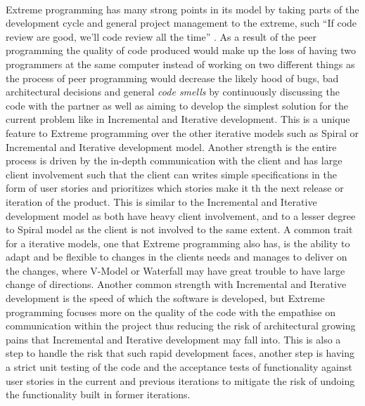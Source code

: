 \documentclass{style/CRPITStyle}
\renewcommand{\cite}{\citep}
\begin{document}
\paragraph{}
Extreme programming has many strong points in its model by taking parts of the
development cycle and general project management to the extreme, such ``If code
review are good, we'll code review all the time'' \cite{beck:2000:xp}. As a
result of the peer programming the quality of code produced would make up the
loss of having two programmers at the same computer instead of working on two
different things as the process of peer programming would decrease the
likely hood of bugs, bad architectural decisions and general \emph{code smells}
by continuously discussing the code with the partner as well as aiming to
develop the simplest solution for the current problem like in Incremental and
Iterative development. This is a unique feature
to Extreme programming over the other iterative models such as Spiral or
Incremental and Iterative development model.
Another strength is the entire process is driven by the in-depth communication with
the client and has large client involvement such that the client can writes simple specifications
in the form of user stories and prioritizes which stories make it th the next
release or iteration of the product. This is similar to the Incremental and Iterative
development model as both have heavy client involvement, and to a lesser degree
to Spiral model as the client is not involved to the same extent.
A common trait for a iterative models, one that Extreme programming also has, is
the ability to adapt and be flexible to changes in the clients needs and manages
to deliver on the changes, where V-Model or Waterfall may have great trouble to have
large change of directions.
Another common strength with Incremental and Iterative development is the speed
of which the software is developed, but Extreme programming focuses more on the
quality of the code with the empathise on communication within the project thus
reducing the risk of architectural growing pains that Incremental and Iterative
development may fall into. 
This is also a step to handle the risk that such rapid development faces,
another step is having a strict unit testing of the code and the acceptance tests 
of functionality against user stories in the current and previous
iterations to mitigate the risk of undoing the functionality built in former
iterations.

\end{document}
